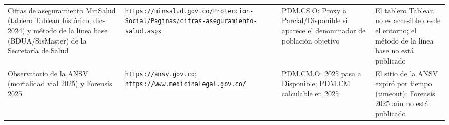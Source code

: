 \documentclass[11pt,letterpaper]{article}
\begin{document}
{\begin{xltabular}{\linewidth}{L{3.6cm}YL{3cm}L{3cm}}
Cifras de aseguramiento MinSalud (tablero Tableau histórico, dic-2024) y método de la línea base (BDUA/SisMaster) de la Secretaría de Salud & \texttt{\footnotesize \href{https://minsalud.gov.co/Proteccion-Social/Paginas/cifras-aseguramiento-salud.aspx}{https:/\allowbreak{}}\allowbreak{}\href{https://minsalud.gov.co/Proteccion-Social/Paginas/cifras-aseguramiento-salud.aspx}{/\allowbreak{}}\allowbreak{}\href{https://minsalud.gov.co/Proteccion-Social/Paginas/cifras-aseguramiento-salud.aspx}{minsalud.\allowbreak{}gov.\allowbreak{}co/\allowbreak{}}\allowbreak{}\href{https://minsalud.gov.co/Proteccion-Social/Paginas/cifras-aseguramiento-salud.aspx}{Proteccion-\allowbreak{}Social/\allowbreak{}}\allowbreak{}\href{https://minsalud.gov.co/Proteccion-Social/Paginas/cifras-aseguramiento-salud.aspx}{Paginas/\allowbreak{}}\allowbreak{}\href{https://minsalud.gov.co/Proteccion-Social/Paginas/cifras-aseguramiento-salud.aspx}{cifras-\allowbreak{}aseguramiento-\allowbreak{}salud.\allowbreak{}aspx}} & PDM.CS.O: Proxy a Parcial/Disponible si aparece el denominador de población objetivo & El tablero Tableau no es accesible desde el entorno; el método de la línea base no está publicado \\
Observatorio de la ANSV (mortalidad vial 2025) y Forensis 2025 & \texttt{\footnotesize \href{https://ansv.gov.co}{https:/\allowbreak{}}\allowbreak{}\href{https://ansv.gov.co}{/\allowbreak{}}\allowbreak{}\href{https://ansv.gov.co}{ansv.\allowbreak{}gov.\allowbreak{}co}}; \newline \texttt{\footnotesize \href{https://www.medicinalegal.gov.co/}{https:/\allowbreak{}}\allowbreak{}\href{https://www.medicinalegal.gov.co/}{/\allowbreak{}}\allowbreak{}\href{https://www.medicinalegal.gov.co/}{www.\allowbreak{}medicinalegal.\allowbreak{}gov.\allowbreak{}co/\allowbreak{}}} & PDM.CM.O: 2025 pasa a Disponible; PDM.CM calculable en 2025 & El sitio de la ANSV expiró por tiempo (timeout); Forensis 2025 aún no está publicado \\

\end{xltabular}}
\end{document}
